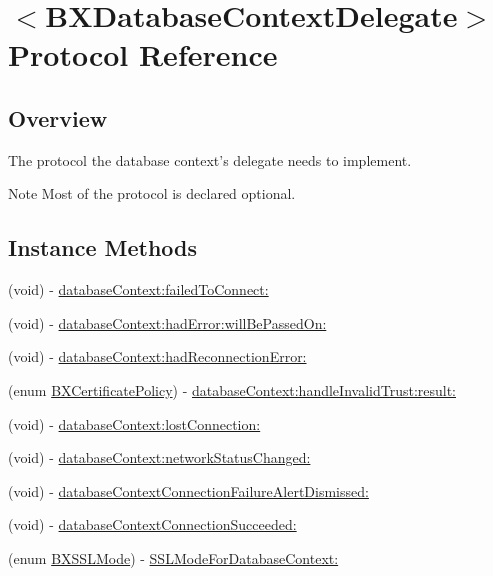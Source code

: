 \hypertarget{protocol_b_x_database_context_delegate-p}{}\section{$<$B\+X\+Database\+Context\+Delegate$>$ Protocol Reference}
\label{protocol_b_x_database_context_delegate-p}


\subsection{Overview}
The protocol the database context's delegate needs to implement. \begin{DoxyNote}{Note}
Most of the protocol is declared optional. 
\end{DoxyNote}
\subsection*{Instance Methods}
\begin{DoxyCompactItemize}
\item 
(void) -\/ \hyperlink{protocol_b_x_database_context_delegate-p_a8876f51cb221e1e637d670ad28e2fb70}{database\+Context\+:failed\+To\+Connect\+:}
\item 
(void) -\/ \hyperlink{protocol_b_x_database_context_delegate-p_a7225b66321a98e0c78dc46743517167c}{database\+Context\+:had\+Error\+:will\+Be\+Passed\+On\+:}
\item 
(void) -\/ \hyperlink{protocol_b_x_database_context_delegate-p_aec9d16c1c021751c1133d8a731192d8e}{database\+Context\+:had\+Reconnection\+Error\+:}
\item 
(enum \hyperlink{_b_x_constants_8h_a80b9c289a6af363458e99988befceba3}{B\+X\+Certificate\+Policy}) -\/ \hyperlink{protocol_b_x_database_context_delegate-p_a84b5137af0edbf8be886bd6ddf2e0d9c}{database\+Context\+:handle\+Invalid\+Trust\+:result\+:}
\item 
(void) -\/ \hyperlink{protocol_b_x_database_context_delegate-p_a5e80c96e9141bb55345bdc311bf0daa0}{database\+Context\+:lost\+Connection\+:}
\item 
(void) -\/ \hyperlink{protocol_b_x_database_context_delegate-p_a57b544628f1bc31d6bf965eba463dce9}{database\+Context\+:network\+Status\+Changed\+:}
\item 
(void) -\/ \hyperlink{protocol_b_x_database_context_delegate-p_adbf6c93035fa905af1687cb140722d75}{database\+Context\+Connection\+Failure\+Alert\+Dismissed\+:}
\item 
(void) -\/ \hyperlink{protocol_b_x_database_context_delegate-p_a408a0aec2c29c263828cf2892ca48fe3}{database\+Context\+Connection\+Succeeded\+:}
\item 
(enum \hyperlink{_b_x_constants_8h_aa90c820a219290fe23398cb49a4a9316}{B\+X\+S\+S\+L\+Mode}) -\/ \hyperlink{protocol_b_x_database_context_delegate-p_ad9b0cd8d7c44982849aec02146827664}{S\+S\+L\+Mode\+For\+Database\+Context\+:}
\end{DoxyCompactItemize}


